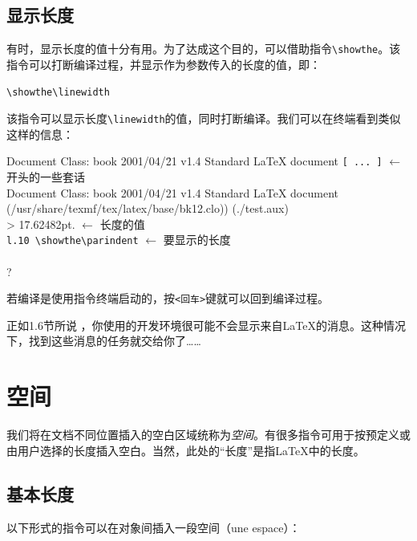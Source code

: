 \subsection{显示长度}

有时，显示长度的值十分有用。为了达成这个目的，可以借助指令\verb|\showthe|。该指令可以打断编译过程，并显示作为参数传入的长度的值，即：

\begin{dmd}
\verb|\showthe\linewidth|
\end{dmd}

该指令可以显示长度\verb|\linewidth|的值，同时打断编译。我们可以在终端看到类似这样的信息：

\begin{dmd}
\begin{tabbing}
Document Class: book 2001/04/\= 21 v1.4 Standard LaTeX document\kill
\verb|[ ... ]| \> $\leftarrow$ \textsf{开头的一些套话}\\
Document Class: book 2001/04/21 v1.4 Standard LaTeX document\\
(/usr/share/texmf/tex/latex/base/bk12.clo)) (./test.aux)\\
> 17.62482pt. \> $\leftarrow$ \textsf{长度的值}\\
\verb|l.10 \showthe\parindent| \> $\leftarrow$ \textsf{要显示的长度}\\
~\\
?
\end{tabbing}
\end{dmd}

若编译是使用指令终端启动的，按\verb|<回车>|键就可以回到编译过程。

\begin{ii}
正如1.6节所说%
，你使用的开发环境很可能不会显示来自\LaTeX 的消息。这种情况下，找到这些消息的任务就交给你了……
\end{ii}


\section{空间}

我们将在文档不同位置插入的空白区域统称为\emph{空间}。有很多指令可用于按预定义或由用户选择的长度插入空白。当然，此处的“长度”是指\LaTeX 中的长度。

\subsection{基本长度}

以下形式的指令可以在对象间插入一段空间（une espace）：

